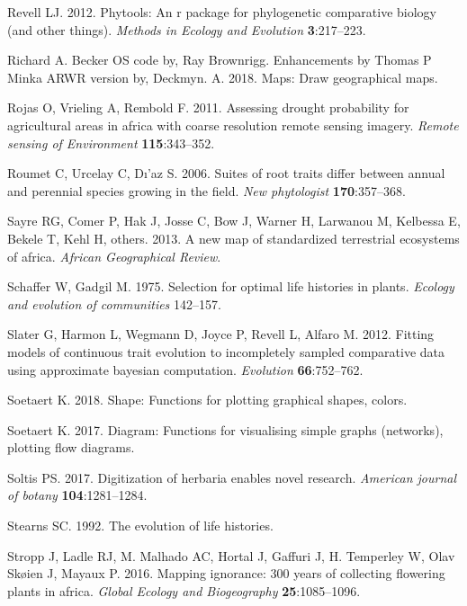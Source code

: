 \documentclass[man,floatsintext]{apa6}
\theoremstyle{definition}
\theoremstyle{definition}
\theoremstyle{definition}
\theoremstyle{remark}
\begin{document}
\leavevmode\hypertarget{ref-R-phytools}{}%
Revell LJ. 2012. Phytools: An r package for phylogenetic comparative
biology (and other things). \emph{Methods in Ecology and Evolution}
\textbf{3}:217--223.

\leavevmode\hypertarget{ref-R-maps}{}%
Richard A. Becker OS code by, Ray Brownrigg. Enhancements by Thomas P
Minka ARWR version by, Deckmyn. A. 2018. Maps: Draw geographical maps.

\leavevmode\hypertarget{ref-rojas2011assessing}{}%
Rojas O, Vrieling A, Rembold F. 2011. Assessing drought probability for
agricultural areas in africa with coarse resolution remote sensing
imagery. \emph{Remote sensing of Environment} \textbf{115}:343--352.

\leavevmode\hypertarget{ref-roumet2006suites}{}%
Roumet C, Urcelay C, Dı'az S. 2006. Suites of root traits differ between
annual and perennial species growing in the field. \emph{New
phytologist} \textbf{170}:357--368.

\leavevmode\hypertarget{ref-sayre2013new}{}%
Sayre RG, Comer P, Hak J, Josse C, Bow J, Warner H, Larwanou M, Kelbessa
E, Bekele T, Kehl H, others. 2013. A new map of standardized terrestrial
ecosystems of africa. \emph{African Geographical Review}.

\leavevmode\hypertarget{ref-schaffer1975selection}{}%
Schaffer W, Gadgil M. 1975. Selection for optimal life histories in
plants. \emph{Ecology and evolution of communities} 142--157.

\leavevmode\hypertarget{ref-R-geiger_c}{}%
Slater G, Harmon L, Wegmann D, Joyce P, Revell L, Alfaro M. 2012.
Fitting models of continuous trait evolution to incompletely sampled
comparative data using approximate bayesian computation.
\emph{Evolution} \textbf{66}:752--762.

\leavevmode\hypertarget{ref-R-shape}{}%
Soetaert K. 2018. Shape: Functions for plotting graphical shapes,
colors.

\leavevmode\hypertarget{ref-R-diagram}{}%
Soetaert K. 2017. Diagram: Functions for visualising simple graphs
(networks), plotting flow diagrams.

\leavevmode\hypertarget{ref-soltis2017digitization}{}%
Soltis PS. 2017. Digitization of herbaria enables novel research.
\emph{American journal of botany} \textbf{104}:1281--1284.

\leavevmode\hypertarget{ref-stearns1992evolution}{}%
Stearns SC. 1992. The evolution of life histories.

\leavevmode\hypertarget{ref-stropp2016mapping}{}%
Stropp J, Ladle RJ, M. Malhado AC, Hortal J, Gaffuri J, H. Temperley W,
Olav Skøien J, Mayaux P. 2016. Mapping ignorance: 300 years of
collecting flowering plants in africa. \emph{Global Ecology and
Biogeography} \textbf{25}:1085--1096.
\end{document}
